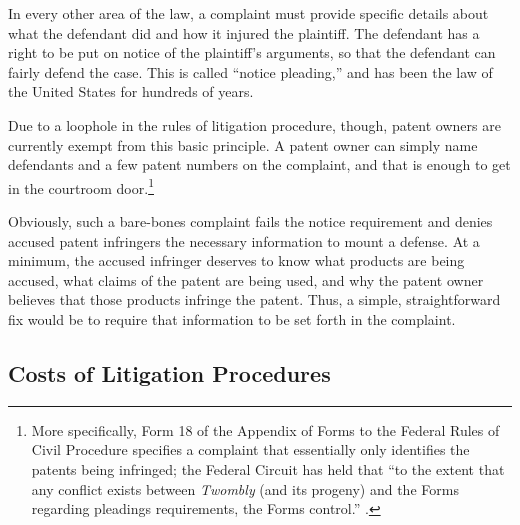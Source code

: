 \documentclass[11pt,twocolumn,titlepage]{article}
\begin{document}
In every other area of the law, a complaint must provide specific details about
what the defendant did and how it injured the plaintiff. The defendant has a
right to be put on notice of the plaintiff's arguments, so that the defendant
can fairly defend the case.
This is called ``notice pleading,'' and has been the
law of the United States for hundreds of years.

Due to a loophole in the rules of litigation procedure, though, patent owners
are currently exempt from this basic principle. A patent owner can simply name
defendants and a few patent numbers on the complaint, and that is enough to get
in the courtroom door.\footnote{More specifically, Form 18 of the Appendix of
Forms to the Federal Rules of Civil Procedure specifies a complaint that
essentially only identifies the patents being infringed; the Federal Circuit has
held that ``to the extent that any conflict exists between \emph{Twombly} (and
its progeny) and the Forms regarding pleadings requirements, the Forms
control.'' .}

Obviously, such a bare-bones complaint fails the notice requirement and denies
accused patent infringers the necessary information to mount a
defense.
At a
minimum, the accused infringer deserves to know what products are being accused,
what claims of the patent are being used, and why the patent owner believes that
those products infringe the patent. Thus, a simple, straightforward fix would be
to require that information to be set forth in the complaint.

\subsection{Costs of Litigation Procedures}
\SectionNote
\end{document}

